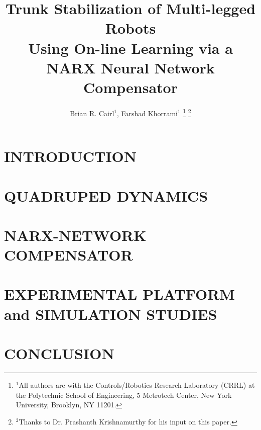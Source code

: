 \documentclass[letterpaper, 10 pt, conference]{ieeeconf}  %
\title{\LARGE \bf
Trunk Stabilization of Multi-legged Robots \\
Using On-line Learning via a NARX Neural Network Compensator
}
\author{
Brian R. Cairl$^{1}$,
Farshad Khorrami$^{1}$
\thanks{%
	$^{1}$All authors are with the Controls/Robotics Research Laboratory (CRRL)
	at the  Polytechnic School of Engineering,
	5 Metrotech Center, New York University, Brooklyn, NY 11201.
}%
\thanks{
	$^{2}$Thanks to Dr. Prashanth Krishnamurthy for his input on this paper.
}
}%
\begin{document}
\newcommand{\TightSectionBeg}[1]{\vspace{0mm}\section{#1}\vspace{-0.1mm}}
\newcommand{\TightSectionEnd}{\vspace{-0.1mm}}
\newcommand{\PostImageCloseSpace}{\vspace{-4mm}}

\maketitle
\thispagestyle{empty}
\pagestyle{empty}


\begin{abstract}



\end{abstract}


\section{INTRODUCTION}

%
%
\TightSectionBeg{QUADRUPED DYNAMICS}

\TightSectionEnd
%
%
\TightSectionBeg{NARX-NETWORK COMPENSATOR}

\TightSectionEnd
%
%
\TightSectionBeg{EXPERIMENTAL PLATFORM and SIMULATION STUDIES}

\TightSectionEnd
%
%
\TightSectionBeg{CONCLUSION}

\TightSectionEnd
%
%
%
%




\end{document}
